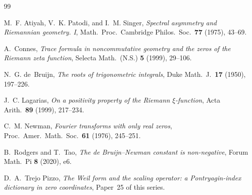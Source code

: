 \documentclass[11pt]{amsart}
\begin{document}
\begin{thebibliography}{99}

M.~F. Atiyah, V.~K. Patodi, and I.~M. Singer,
\textit{Spectral asymmetry and Riemannian geometry. I},
Math.\ Proc.\ Cambridge Philos.\ Soc.\ \textbf{77} (1975), 43--69.

A.~Connes,
\textit{Trace formula in noncommutative geometry and the zeros of the Riemann
  zeta function},
Selecta Math.\ (N.S.) \textbf{5} (1999), 29--106.

N.~G. de~Bruijn,
\textit{The roots of trigonometric integrals},
Duke Math.\ J.\ \textbf{17} (1950), 197--226.

J.~C. Lagarias,
\textit{On a positivity property of the Riemann $\xi$-function},
Acta Arith.\ \textbf{89} (1999), 217--234.

C.~M. Newman,
\textit{Fourier transforms with only real zeros},
Proc.\ Amer.\ Math.\ Soc.\ \textbf{61} (1976), 245--251.

B.~Rodgers and T.~Tao,
\textit{The de Bruijn--Newman constant is non-negative},
Forum Math.\ Pi \textbf{8} (2020), e6.

D.~A.~Trejo Pizzo,
\textit{The Weil form and the scaling operator: a Pontryagin-index dictionary in zero
coordinates}, Paper~25 of this series.

\end{thebibliography}
\end{document}
